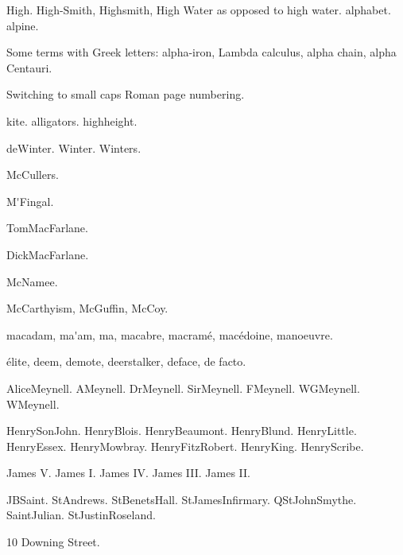 \documentclass{article}
\newcommand*{\myscroman}[1]{%
  \myscromannum{\value{#1}}%
}
\newcommand*{\myscromannum}[1]{%
  \textsc{\romannumeral#1}%
}
\begin{document}
\gls{High}. \gls{High-Smith}, \gls{Highsmith}, \gls{High Water}
as opposed to \gls{high water}. \Gls{alphabet}. \Gls{alpine}.

Some terms with Greek letters: \gls{alpha-iron}, 
\gls{Lambda calculus}, \gls{alpha chain}, \gls{alpha Centauri}.

\newpage

\renewcommand{\thepage}{\myscroman{page}}%
Switching to small caps Roman page numbering.

\Gls{kite}. \Glspl{alligator}. \Gls{highheight}.

\gls{deWinter}.
\gls{Winter}.
\gls{Winters}.

\gls{McCullers}.

\gls{M'Fingal}.

\gls{TomMacFarlane}.

\gls{DickMacFarlane}.

\gls{McNamee}.

\gls{McCarthyism},
\gls{McGuffin},
\gls{McCoy}.

\Gls{macadam},
\gls{ma'am},
\gls{ma},
\gls{macabre},
\gls{macramé},
\gls{macédoine},
\gls{manoeuvre}.

\Gls{élite},
\gls{deem},
\gls{demote},
\gls{deerstalker},
\gls{deface},
\gls{de facto}.


\gls{AliceMeynell}.
\gls{AMeynell}.
\gls{DrMeynell}.
\gls{SirMeynell}.
\gls{FMeynell}.
\gls{WGMeynell}.
\gls{WMeynell}.

\gls{HenrySonJohn}. \gls{HenryBlois}.
\gls{HenryBeaumont}. \gls{HenryBlund}.
\gls{HenryLittle}. \gls{HenryEssex}. \gls{HenryMowbray}.
\gls{HenryFitzRobert}.
\gls{HenryKing}. \gls{HenryScribe}.

\gls{James V}.
\gls{James I}.
\gls{James IV}.
\gls{James III}.
\gls{James II}.

\gls{JBSaint}.
\gls{StAndrews}.
\gls{StBenetsHall}.
\gls{StJamesInfirmary}.
\gls{QStJohnSmythe}.
\gls{SaintJulian}.
\gls{StJustinRoseland}.

\gls{10 Downing Street}.

\newpage


\renewcommand{\dtlnonlettergroup}[1]{Symbols}

\printterms
 [
   heading={\section[Word Sorted Index]},%
   database=index,%
   prelocation=dotfill,%
   columns=3,%
   style=index,%
   postheading={Locations in bold indicate primary reference.
   (Word sort.)},
   showgroups, %
 ]
\end{document}
